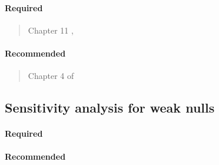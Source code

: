 \documentclass[12pt]{article}
\begin{document}
\paragraph*{Required}

\begin{verse}
  Chapter 11 , 
\end{verse}

\paragraph*{Recommended}

\begin{verse} Chapter 4 of  \end{verse}

\begin{verse}  \end{verse}

\begin{verse}  \end{verse}

\begin{verse}  \end{verse}

\begin{verse}  \end{verse}


\subsection{Sensitivity analysis for weak nulls}

\paragraph*{Required}

\begin{verse}  \end{verse}

\paragraph*{Recommended}

\begin{verse}  \end{verse}

\begin{verse}  \end{verse}
\end{document}
